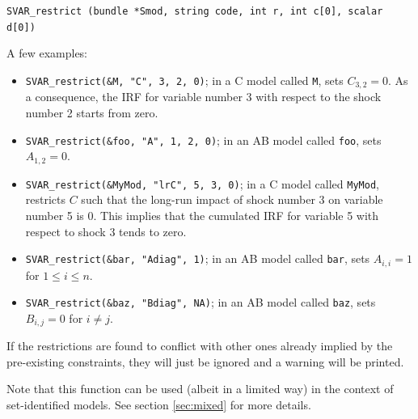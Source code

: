 \documentclass[a4paper,10pt]{article}
\newenvironment{funcdoc}[1]
{\noindent\hrulefill\newline\nopagebreak\texttt{#1}%
\nopagebreak\par\noindent\hrulefill%
\nopagebreak\par\nopagebreak\smallskip\nopagebreak\par}
{\bigskip}
\begin{document}
\begin{funcdoc}{SVAR\_restrict (bundle *Smod, string code, int r, int c[0], scalar d[0])}
A few examples: 
\begin{itemize}
\item \texttt{SVAR\_restrict(\&M, "C", 3, 2, 0)}; in a C model called
  \texttt{M}, sets $C_{3,2} = 0$. As a consequence, the IRF for
  variable number 3 with respect to the shock number 2 starts from
  zero.
\item \texttt{SVAR\_restrict(\&foo, "A", 1, 2, 0)}; in an AB model called
  \texttt{foo}, sets $A_{1,2} = 0$.
\item \texttt{SVAR\_restrict(\&MyMod, "lrC", 5, 3, 0)}; in a C model
  called \texttt{MyMod}, restricts $C$ such that the long-run impact
  of shock number 3 on variable number 5 is 0. This implies that the
  cumulated IRF for variable 5 with respect to shock 3 tends to zero.
\item \texttt{SVAR\_restrict(\&bar, "Adiag", 1)}; in an AB model called
  \texttt{bar}, sets $A_{i,i} = 1$ for $1 \le i \le n$.
\item \texttt{SVAR\_restrict(\&baz, "Bdiag", NA)}; in an AB model called
  \texttt{baz}, sets $B_{i,j} = 0$ for $i \ne j$.
\end{itemize}

If the restrictions are found to conflict with other ones already
implied by the pre-existing constraints, they will just be ignored and
a warning will be printed.

Note that this function can be used (albeit in a limited way) in the
context of set-identified models. See section \ref{sec:mixed} for more details.
\end{funcdoc}
\end{document}
